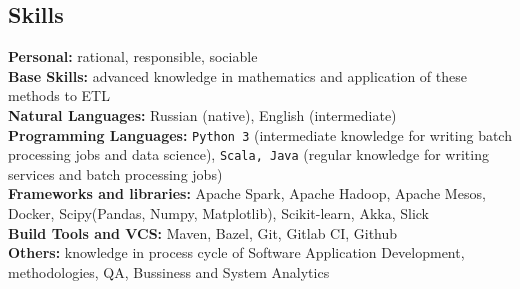 \subsection*{Skills}
\textbf{Personal:} rational, responsible, sociable \\
\textbf{Base Skills:} advanced knowledge in mathematics and application of these methods to ETL \\
\textbf{Natural Languages:} Russian (native), English (intermediate) \\
\textbf{Programming Languages:} \texttt{Python 3} (intermediate knowledge for writing batch processing jobs and data
science), \texttt{Scala, Java} (regular knowledge for writing services and batch processing jobs) \\
\textbf{Frameworks and libraries:} Apache Spark, Apache Hadoop, Apache Mesos, Docker, Scipy(Pandas, Numpy,
Matplotlib), Scikit-learn, Akka, Slick \\
\textbf{Build Tools and VCS:} Maven, Bazel, Git, Gitlab CI, Github \\
\textbf{Others:} knowledge in process cycle of Software Application Development, methodologies, QA, Bussiness and System Analytics